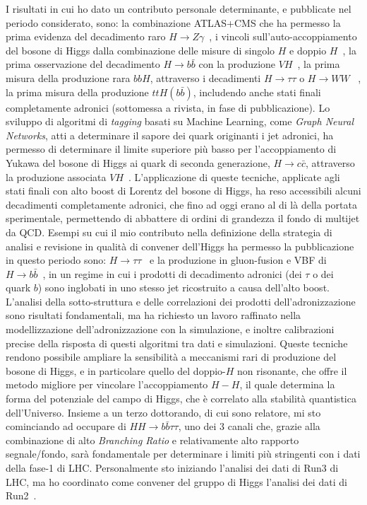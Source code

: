 \documentclass[a4paper,12pt,twoside]{article}
\begin{document}
{ I risultati in cui ho dato un contributo personale determinante, e pubblicate nel periodo considerato, sono: la combinazione ATLAS+CMS che ha
 permesso la prima evidenza del decadimento raro $H\to
 Z\gamma$~, i vincoli sull'auto-accoppiamento del bosone
 di Higgs dalla combinazione delle misure di singolo $H$ e doppio
 $H$~, la prima osservazione del decadimento $H\to b\bar{b}$
 con la produzione $VH$~, la prima misura della produzione
 rara $bbH$, attraverso i decadimenti $H\to\tau\tau$ o $H\to WW$
 ~, la prima misura della produzione $ttH(b\bar{b})$,
 includendo anche stati finali completamente adronici (sottomessa a rivista, in fase di pubblicazione). Lo sviluppo di
 algoritmi di {\it tagging} basati su Machine Learning, come {\it
   Graph Neural Networks}, atti a determinare il sapore dei quark
 originanti i jet adronici, ha permesso di determinare il limite superiore pi\`u basso
 per l'accoppiamento di Yukawa del bosone di Higgs ai quark di seconda
 generazione, $H\to c\bar c$, attraverso la produzione associata
 $VH$~. L'applicazione di queste tecniche, applicate
 agli stati finali con alto boost di Lorentz del bosone di Higgs, ha
 reso accessibili alcuni decadimenti completamente adronici, che fino
 ad oggi erano al di l\`a della portata sperimentale, permettendo di
 abbattere di ordini di grandezza il fondo di multijet da QCD. Esempi
 su cui il mio contributo nella definizione della strategia di analisi
 e revisione in qualit\`a di convener dell'Higgs ha permesso la
 pubblicazione in questo periodo sono: $H\to \tau\tau$~
 e la produzione in gluon-fusion e VBF di $H\to b\bar{b}$~, in un regime
 in cui i prodotti di decadimento adronici (dei $\tau$ o dei quark
 $b$) sono inglobati in uno stesso jet ricostruito a causa dell'alto
 boost. L'analisi della sotto-struttura e delle correlazioni dei
 prodotti dell'adronizzazione sono risultati fondamentali, ma ha
 richiesto un lavoro raffinato nella modellizzazione
 dell'adronizzazione con la simulazione, e inoltre calibrazioni
 precise della risposta di questi algoritmi tra dati e
 simulazioni. Queste tecniche rendono possibile ampliare la sensibilit\`a a meccanismi rari di produzione del bosone di Higgs, e in particolare quello del doppio-$H$ non risonante, che offre il metodo migliore per vincolare l'accoppiamento $H-H$, il quale determina la forma del potenziale del campo di Higgs, che \`e correlato alla stabilit\`a quantistica dell'Universo. Insieme a un terzo dottorando, di cui sono relatore, mi sto cominciando ad occupare di $HH\to b\bar{b}\tau\tau$, uno dei 3 canali che, grazie alla combinazione di alto {\it Branching Ratio} e relativamente alto rapporto segnale/fondo, sar\`a fondamentale per determinare i limiti pi\`u stringenti con i dati della fase-1 di LHC. Personalmente sto iniziando l'analisi dei dati di Run3 di LHC, ma ho coordinato come convener del gruppo di Higgs l'analisi dei dati di Run2~. 
 
}
\end{document}
